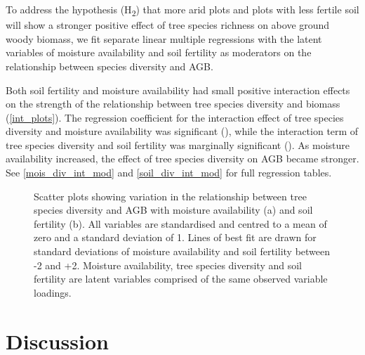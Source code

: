 \documentclass[11pt,a4paper]{article}
\begin{document}
To address the hypothesis (H\textsubscript{2}) that more arid plots and plots with less fertile soil will show a stronger positive effect of tree species richness on above ground woody biomass, we fit separate linear multiple regressions with the latent variables of moisture availability and soil fertility as moderators on the relationship between species diversity and AGB.

Both soil fertility and moisture availability had small positive interaction effects on the strength of the relationship between tree species diversity and biomass (\autoref{int_plots}). The regression coefficient for the interaction effect of tree species diversity and moisture availability was significant (\moderp{}), while the interaction term of tree species diversity and soil fertility was marginally significant (\moders{}). As moisture availability increased, the effect of tree species diversity on AGB became stronger. See \autoref{mois_div_int_mod} and \autoref{soil_div_int_mod} for full regression tables.


\begin{figure}[H]
\centering
	\caption{Scatter plots showing variation in the relationship between tree species diversity and AGB with moisture availability (a) and soil fertility (b). All variables are standardised and centred to a mean of zero and a standard deviation of 1. Lines of best fit are drawn for standard deviations of moisture availability and soil fertility between -2 and +2. Moisture availability, tree species diversity and soil fertility are latent variables comprised of the same observed variable loadings.}
	\label{int_plots}
\end{figure}

\section{Discussion}

\end{document}
